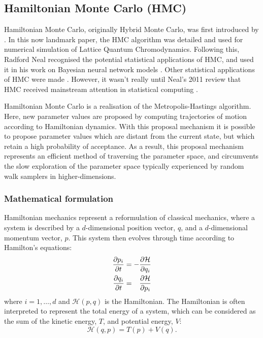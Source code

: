 \subsection{Hamiltonian Monte Carlo (HMC)}

Hamiltonian Monte Carlo, originally Hybrid Monte Carlo, was first introduced by
\textcite{duane87}.  In this now landmark paper, the HMC algorithm was detailed and used
for numerical simulation of Lattice Quantum Chromodynamics. Following this, Radford Neal
recognised the potential statistical applications of HMC, and used it in his work on
Bayesian neural network models \parencite{neal95}. Other statistical applications of HMC
were made \parencite{ishwaran99,williams06}.  However, it wasn't really until Neal's 2011
review \parencite{neal11} that HMC received mainstream attention in statistical computing
\parencite{betancourt18}.

Hamiltonian Monte Carlo is a realisation of the Metropolis-Hastings algorithm. Here,
new parameter values are proposed by computing trajectories of motion according to
Hamiltonian dynamics. With this proposal mechanism it is possible to propose parameter
values which are distant from the current state, but which retain a high probability of
acceptance. As a result, this proposal mechanism represents an efficient method of
traversing the parameter space, and circumvents the slow exploration of the parameter
space typically experienced by random walk samplers in higher-dimensions.

\subsubsection{Mathematical formulation}

Hamiltonian mechanics represent a reformulation of classical mechanics, where a system is
described by a $d$-dimensional position vector, $q$, and a $d$-dimensional momentum
vector, $p$. This system then evolves through time according to Hamilton's
equations:
\begin{align}
    \begin{split}
    \pdv{p_i}{t} &= - \pdv{\mathcal{H}}{q_i}\\
    \pdv{q_i}{t} &= \hphantom{-} \pdv{\mathcal{H}}{p_i}
    \end{split}
\end{align}
where $i=1,\ldots,d$ and $\mathcal{H}(p, q)$ is the Hamiltonian. The
Hamiltonian is often interpreted to represent the total energy of a system, which can be
considered as the sum of the kinetic energy, $T$, and potential energy, $V$:
\begin{equation}
    \label{eq:hamiltonian_decomp}
    \mathcal{H}(q, p) = T(p) + V(q).
\end{equation}

